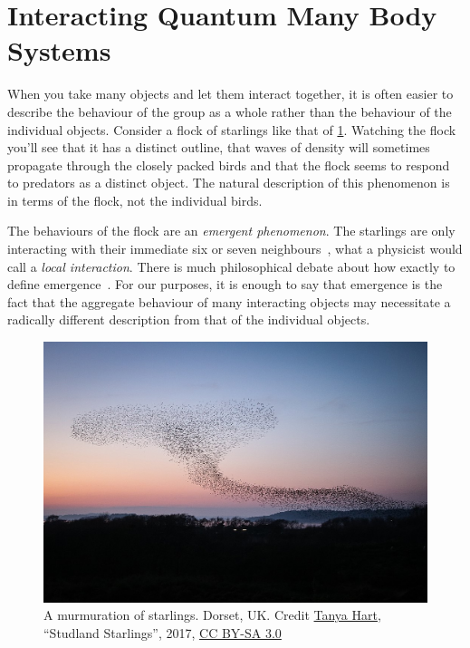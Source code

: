 \hypertarget{interacting-quantum-many-body-systems}{%
\section{Interacting Quantum Many Body Systems}\label{interacting-quantum-many-body-systems}}

When you take many objects and let them interact together, it is often easier to describe the behaviour of the group as a whole rather than the behaviour of the individual objects. Consider a flock of starlings like that of \cref{fig:Studland_Starlings}. Watching the flock you'll see that it has a distinct outline, that waves of density will sometimes propagate through the closely packed birds and that the flock seems to respond to predators as a distinct object. The natural description of this phenomenon is in terms of the flock, not the individual birds.

The behaviours of the flock are an \emph{emergent phenomenon}. The starlings are only interacting with their immediate six or seven neighbours~\autocite{king2012murmurations,balleriniInteractionRulingAnimal2008}, what a physicist would call a \emph{local interaction}. There is much philosophical debate about how exactly to define emergence~\autocite{andersonMoreDifferent1972,kivelsonDefiningEmergencePhysics2016}. For our purposes, it is enough to say that emergence is the fact that the aggregate behaviour of many interacting objects may necessitate a radically different description from that of the individual objects.

\hypertarget{fig:Studland_Starlings}{%
\begin{figure}
\centering
\includegraphics[width=1\textwidth,height=\textheight]{figure_code/intro_chapter/Studland_Starlings.jpeg}
\caption[{A murmuration of Starlings}]{A murmuration of starlings. Dorset, UK. Credit \href{https://twitter.com/arripay}{Tanya Hart}, ``Studland Starlings'', 2017, \href{https://creativecommons.org/licenses/by-sa/3.0/deed.en}{CC BY-SA 3.0}}
\label{fig:Studland_Starlings}
\end{figure}
}

